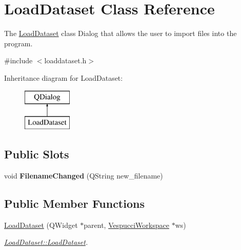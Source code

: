 \hypertarget{class_load_dataset}{}\section{Load\+Dataset Class Reference}
\label{class_load_dataset}


The \hyperlink{class_load_dataset}{Load\+Dataset} class Dialog that allows the user to import files into the program.  




{\ttfamily \#include $<$loaddataset.\+h$>$}

Inheritance diagram for Load\+Dataset\+:\begin{figure}[H]
\begin{center}
\leavevmode
\includegraphics[height=2.000000cm]{class_load_dataset}
\end{center}
\end{figure}
\subsection*{Public Slots}
\begin{DoxyCompactItemize}
\item 
void {\bfseries Filename\+Changed} (Q\+String new\+\_\+filename)\hypertarget{class_load_dataset_ac9fa943d881a92fac675753e85207da9}{}\label{class_load_dataset_ac9fa943d881a92fac675753e85207da9}

\end{DoxyCompactItemize}
\subsection*{Public Member Functions}
\begin{DoxyCompactItemize}
\item 
\hyperlink{class_load_dataset_a23139475dbcb8e5d44ba83fe46621334}{Load\+Dataset} (Q\+Widget $\ast$parent, \hyperlink{class_vespucci_workspace}{Vespucci\+Workspace} $\ast$ws)
\begin{DoxyCompactList}\small\item\em \hyperlink{class_load_dataset_a23139475dbcb8e5d44ba83fe46621334}{Load\+Dataset\+::\+Load\+Dataset}. \end{DoxyCompactList}\end{DoxyCompactItemize}


